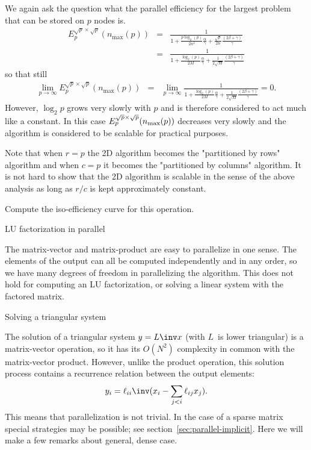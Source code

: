 We again ask the question what the parallel 
efficiency for the largest problem that can be stored on $ p $ nodes is.
\begin{eqnarray*}
E_p^{\sqrt{p} \times \sqrt{p}}(n_{\max}(p)) &=& 
\frac{1}
{ 1 + \frac{p \log_2(p)}{2 n^2} \frac{\alpha}{\gamma} 
+ \frac{\sqrt{p}}{2n}\frac{
\left( 2 \beta + \gamma \right)}{\gamma}}
\\
&=&
\frac{1}
{ 1 + \frac{\log_2(p)}{2 M} \frac{\alpha}{\gamma} 
+ \frac{1}{2\sqrt{M}}\frac{
\left( 2 \beta + \gamma \right)}{\gamma}}
\end{eqnarray*}
so that still
\begin{eqnarray*}
\lim_{p \rightarrow \infty}
E_p^{\sqrt{p} \times \sqrt{p}}(n_{\max}(p)) &=& 
\lim_{p \rightarrow \infty}
\frac{1}
{ 1 + \frac{\log_2(p)}{2 M} \frac{\alpha}{\gamma} 
+ \frac{1}{2\sqrt{M}}\frac{
\left( 2 \beta + \gamma \right)}{\gamma}}
=
0.
\end{eqnarray*}
However, $ \log_2{p} $ grows very slowly with $ p $ and is therefore
considered to act much like a constant.  In this case 
$ E_p^{\sqrt{p}\times \sqrt{p}}( n_{\rm max}(p) ) $ decreases very slowly and the algorithm is considered to be scalable for practical purposes.


Note that when $ r = p $ the 2D algorithm becomes the "partitioned by
rows" algorithm and when $ c = p $ it becomes the "partitioned by
columns" algorithm.  It is not hard to show that the 2D algorithm is
scalable in the sense of the above analysis
as long as $r/c$ is kept approximately constant.

\begin{exercise}
  Compute the iso-efficiency curve for this operation.
\end{exercise}


 {LU factorization in parallel}

The matrix-vector and matrix-product are easy to parallelize in one sense.
The elements of the output can all be computed independently and in any order,
so we have many degrees of freedom in parallelizing the algorithm.
This does not hold for computing an LU factorization, or solving a linear system
with the factored matrix.

 {Solving a triangular system}

The solution of a triangular system $y=L\inv x$ (with $L$~is lower triangular)
is a matrix-vector operation, so
it has its $O(N^2)$ complexity in common with the matrix-vector product.
However, unlike the product operation, this solution process contains a recurrence
relation between the output elements: 
\[ y_{i} = \ell_{ii}\inv ( x_i-\sum_{j<i} \ell_{ij}x_j ). \]
This means that parallelization is not trivial.
In the case of a sparse matrix special strategies may be possible; see section~\ref{sec:parallel-implicit}.
Here we will make a few remarks about general, dense case.

